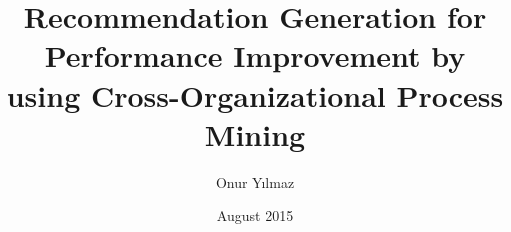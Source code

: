 \documentclass[chaparabic,ceng,ms,12pt,oneandhalf]{metu}
\author{Onur Yılmaz}
\title{Recommendation Generation for Performance Improvement by using Cross-Organizational Process Mining}
\date{August 2015}
\theoremstyle{definition}
\begin{document}
\begin{preliminaries}


\end{preliminaries}
%   
% 
%









%


 
%
% 
\end{document}
